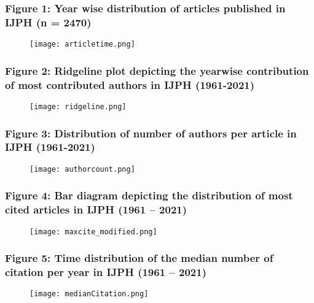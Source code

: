\documentclass[14pt, aspectratio=169]{beamer}
\begin{document}
\begin{frame}
  \frametitle{Figure 1: Year wise distribution of articles published in IJPH (n = 2470) }
  \begin{figure}
    \begin{center}
      \texttt{[image: articletime.png]}
     \end{center}
  \end{figure}
\end{frame}

\begin{frame}
  \frametitle{Figure 2: Ridgeline plot depicting the yearwise contribution of most contributed authors in IJPH (1961-2021)}
  \begin{figure}
    \begin{center}
      \texttt{[image: ridgeline.png]}
     \end{center}
  \end{figure}
\end{frame}

\begin{frame}
  \frametitle{Figure 3: Distribution of number of authors per article in IJPH (1961-2021)}
  \begin{figure}
    \begin{center}
      \texttt{[image: authorcount.png]}
     \end{center}
  \end{figure}
\end{frame}

\begin{frame}
  \frametitle{Figure 4: Bar diagram depicting the distribution of most cited articles in IJPH (1961 – 2021)}
  \begin{figure}
    \begin{center}
      \texttt{[image: maxcite\_modified.png]}
     \end{center}
  \end{figure}
\end{frame}

\begin{frame}
  \frametitle{Figure 5: Time distribution of the median number of citation per year in IJPH (1961 – 2021)}
  \begin{figure}
    \begin{center}
      \texttt{[image: medianCitation.png]}
     \end{center}
  \end{figure}
\end{frame}
\end{document}
